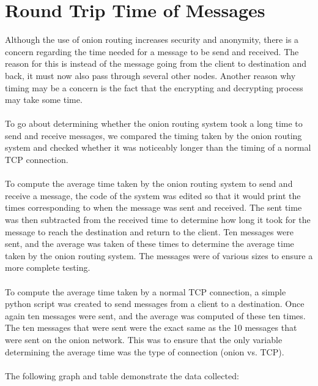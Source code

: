 \documentclass[10pt]{report}
\begin{document}
\section{Round Trip Time of Messages}
Although the use of onion routing increases security and anonymity, there is a concern regarding the
time needed for a message to be send and received. The reason for this is instead of the message
going from the client to destination and back, it must now also pass through several other nodes.
Another reason why timing may be a concern is the fact that the encrypting and decrypting process
may take some time.\\\\
To go about determining whether the onion routing system took a long time to
send and receive messages, we compared the timing taken by the onion routing system and checked
whether it was noticeably longer than the timing of a normal TCP connection.\\\\
To compute the
average time taken by the onion routing system to send and receive a message, the code of the system
was edited so that it would print the times corresponding to when the message was sent and received.
The sent time was then subtracted from the received time to determine how long it took for the
message to reach the destination and return to the client. Ten messages were sent, and the average
was taken of these times to determine the average time taken by the onion routing system. The
messages were of various sizes to ensure a more complete testing.\\\\
To compute the average time
taken by a normal TCP connection, a simple python script was created to send messages from a client
to a destination. Once again ten messages were sent, and the average was computed of these ten
times. The ten messages that were sent were the exact same as the 10 messages that were sent on the
onion network. This was to ensure that the only variable determining the average time was the type
of connection (onion vs. TCP).\\\\
The following graph and table demonstrate the data collected:
\end{document}
